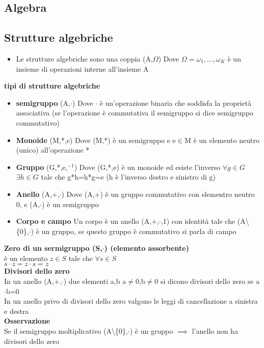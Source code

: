 \documentclass{article}
\begin{document}
	
		\begin{multicols*}{3}
			
			
		\section{Algebra}
		\subsection{Strutture algebriche}
		\begin{itemize}
			\item Le strutture algebriche sono una coppia (A,\(\Omega\)) Dove \(\Omega={\omega_1,...,\omega_K}\) è un insieme di operazioni interne all'insieme A
		\end{itemize}
		\textbf{tipi di strutture algebriche}
		\begin{itemize}
			\item \textbf{semigruppo} (A,\(\cdot\)) Dove \(\cdot\) è un'operazione binaria che soddisfa la proprietà associativa (se l'operazione è commutativa il semigruppo si dice semigruppo commutativo)
			\item \textbf{Monoide} (M,*,e) Dove (M,*) è un semigruppo e e\(\in\)M è un elemento neutro (unico) all'operazione *
			\item \textbf{Gruppo} (G,*,e,\(^{-1}\)) Dove (G,*,e) è un monoide ed esiste l'inverso \(\forall g\in G \)  \(\exists  h\in G \) tale che g*h=h*g=e (h è l'inverso destro e sinistro di g)
			\item \textbf{Anello} (A,+,\(\cdot\)) Dove (A,+) è un gruppo commutativo con elementro neutro 0, e (A,\(\cdot\)) è un semigruppo
			\item \textbf{Corpo e campo} Un corpo è un anello (A,+,\(\cdot\),1) con identità tale che (A\textbackslash \{0\},\(\cdot\)) è un gruppo, se questo gruppo è commutativo si parla di campo
		\end{itemize}
		\textbf{Zero di un sermigruppo (S,\(\cdot\)) (elemento assorbente)}\\
		è un elemento \(z\in S \) tale che \(\forall s \in S\)\\
		\(s\cdot z = z \cdot s = z\)\\
		\textbf{Divisori dello zero}\\
		In un anello (A,+,\(\cdot\)) due elementi a,b a\(\neq\)0,b\(\neq\)0 si dicono divisori dello zero se a\(\cdot\)b=0\\
		In un anello privo di divisori dello zero valgono le leggi di cancellazione a sinistra e destra\\
		\textbf{Osservazione}\\
		Se il semigruppo moltiplicativo (A\textbackslash \{0\},\(\cdot\)) è un gruppo \(\implies\) l'anello non ha divisori dello zero\\
		

\end{multicols*}
\end{document}
